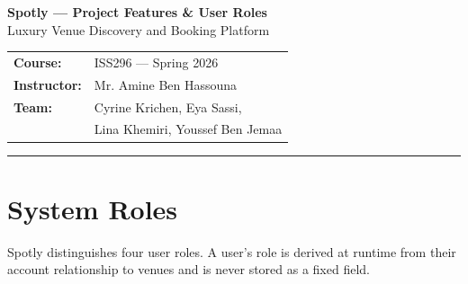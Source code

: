 \documentclass[12pt,a4paper]{article}
\begin{document}
\begin{center}
    {\LARGE\bfseries Spotly --- Project Features \& User Roles}\\[0.5em]
    {\large Luxury Venue Discovery and Booking Platform}\\[1em]
    \begin{tabular}{ll}
        \textbf{Course:}      & ISS296 --- Spring 2026 \\
        \textbf{Instructor:}  & Mr. Amine Ben Hassouna \\
        \textbf{Team:}        & Cyrine Krichen, Eya Sassi, \\
                              & Lina Khemiri, Youssef Ben Jemaa \\
    \end{tabular}
\end{center}

\vspace{1.5em}
\hrule
\vspace{1.5em}

\section{System Roles}

Spotly distinguishes four user roles. A user's role is derived at runtime from
their account relationship to venues and is never stored as a fixed field.
\end{document}
